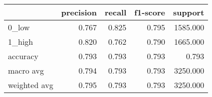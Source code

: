 \begin{tabular}{lrrrr}
\toprule
{} &  precision &  recall &  f1-score &   support \\
\midrule
0\_low        &      0.767 &   0.825 &     0.795 &  1585.000 \\
1\_high       &      0.820 &   0.762 &     0.790 &  1665.000 \\
accuracy     &      0.793 &   0.793 &     0.793 &     0.793 \\
macro avg    &      0.794 &   0.793 &     0.793 &  3250.000 \\
weighted avg &      0.795 &   0.793 &     0.793 &  3250.000 \\
\bottomrule
\end{tabular}
